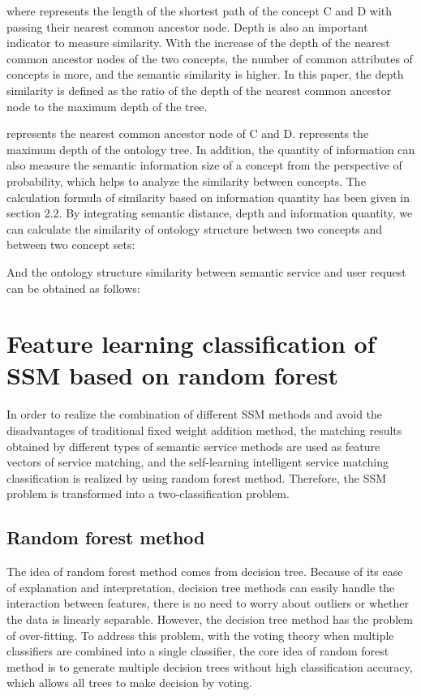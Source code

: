 \documentclass{ieeeaccess}
\begin{document}
where   represents the length of the shortest path of the concept C and D with passing their nearest common ancestor node.
Depth is also an important indicator to measure similarity. With the increase of the depth of the nearest common ancestor nodes of the two concepts, the number of common attributes of concepts is more, and the semantic similarity is higher. In this paper, the depth similarity is defined as the ratio of the depth of the nearest common ancestor node to the maximum depth of the tree.
 
  represents the nearest common ancestor node of C and D.    represents the maximum depth of the ontology tree.
In addition, the quantity of information can also measure the semantic information size of a concept from the perspective of probability, which helps to analyze the similarity between concepts. The calculation formula of similarity based on information quantity has been given in section 2.2.
By integrating semantic distance, depth and information quantity, we can calculate the similarity of ontology structure between two concepts and between two concept sets:
 
 
And the ontology structure similarity between semantic service and user request can be obtained as follows:

\section{Feature learning classification of SSM based on random forest}
In order to realize the combination of different SSM methods and avoid the disadvantages of traditional fixed weight addition method, the matching results obtained by different types of semantic service methods are used as feature vectors of service matching, and the self-learning intelligent service matching classification is realized by using random forest method. Therefore, the SSM problem is transformed into a two-classification problem.

\subsection{Random forest method}
The idea of random forest method comes from decision tree. Because of its ease of explanation and interpretation, decision tree methods can easily handle the interaction between features, there is no need to worry about outliers or whether the data is linearly separable. However, the decision tree method has the problem of over-fitting. To address this problem, with the voting theory when multiple classifiers are combined into a single classifier, the core idea of random forest method is to generate multiple decision trees without high classification accuracy, which allows all trees to make decision by voting. 
\end{document}
